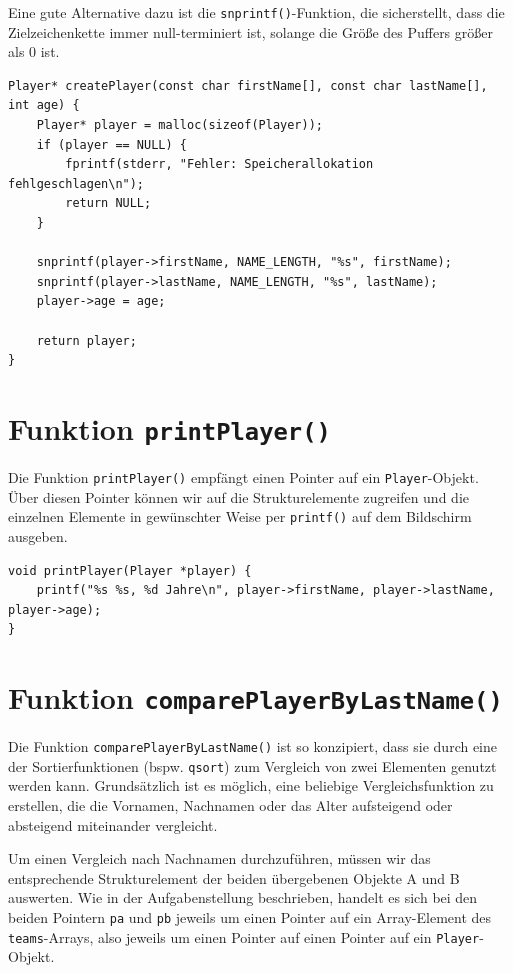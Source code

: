 Eine gute Alternative dazu ist die \texttt{snprintf()}-Funktion, die
sicherstellt, dass die Zielzeichenkette immer null-terminiert ist, solange die
Größe des Puffers größer als 0 ist.

\begin{verbatim}
Player* createPlayer(const char firstName[], const char lastName[], int age) {
    Player* player = malloc(sizeof(Player));
    if (player == NULL) {
        fprintf(stderr, "Fehler: Speicherallokation fehlgeschlagen\n");
        return NULL;
    }

    snprintf(player->firstName, NAME_LENGTH, "%s", firstName);
    snprintf(player->lastName, NAME_LENGTH, "%s", lastName);
    player->age = age;

    return player;
}
\end{verbatim}

\section*{Funktion \texttt{printPlayer()}}

Die Funktion \texttt{printPlayer()} empfängt einen Pointer auf ein
\texttt{Player}-Objekt. Über diesen Pointer können wir auf die
Strukturelemente zugreifen und die einzelnen Elemente in gewünschter Weise per
\texttt{printf()} auf dem Bildschirm ausgeben.

\begin{verbatim}
void printPlayer(Player *player) {
    printf("%s %s, %d Jahre\n", player->firstName, player->lastName, player->age);
}
\end{verbatim}

\section*{Funktion \texttt{comparePlayerByLastName()}}

Die Funktion \texttt{comparePlayerByLastName()} ist so konzipiert, dass
sie durch eine der Sortierfunktionen (bspw. \texttt{qsort}) zum Vergleich
von zwei Elementen genutzt werden kann. Grundsätzlich ist es möglich, eine
beliebige Vergleichsfunktion zu erstellen, die die Vornamen, Nachnamen oder das
Alter aufsteigend oder absteigend miteinander vergleicht.

Um einen Vergleich nach Nachnamen durchzuführen, müssen wir das entsprechende
Strukturelement der beiden übergebenen Objekte A und B auswerten. Wie in der
Aufgabenstellung beschrieben, handelt es sich bei den beiden Pointern
\texttt{pa} und \texttt{pb} jeweils um einen Pointer auf ein
Array-Element des \texttt{teams}-Arrays, also jeweils um einen Pointer
auf einen Pointer auf ein \texttt{Player}-Objekt.

